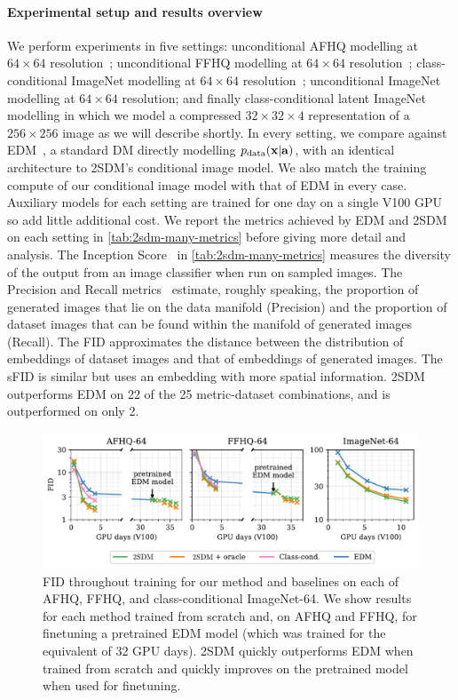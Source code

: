 \paragraph{Experimental setup and results overview}

We perform experiments in five settings: unconditional AFHQ modelling at $64\times64$ resolution~\citep{choi2020stargan}; unconditional FFHQ modelling at $64\times64$ resolution~\citep{karras2018style}; class-conditional ImageNet modelling at $64\times64$ resolution~\citep{deng2009imagenet}; unconditional ImageNet modelling at $64\times64$ resolution; and finally class-conditional latent ImageNet modelling in which we model a compressed $32\times32\times4$ representation of a $256\times256$ image as we will describe shortly. In every setting, we compare against EDM~\citep{karras2022elucidating}, a standard DM directly modelling $p_{\rm{data}}({\mathbf{x}}|{\mathbf{a}})$, with an identical architecture to 2SDM's conditional image model. We also match the training compute of our conditional image model with that of EDM in every case. Auxiliary models for each setting are trained for one day on a single V100 GPU so add little additional cost. We report the metrics achieved by EDM and 2SDM on each setting in \cref{tab:2sdm-many-metrics} before giving more detail and analysis. The Inception Score~\citep{salimans2016improved,barratt2018note} in \cref{tab:2sdm-many-metrics} measures the diversity of the output from an image classifier when run on sampled images. The Precision and Recall metrics~\citep{kynkaanniemi2019improved} estimate, roughly speaking, the proportion of generated images that lie on the data manifold (Precision) and the proportion of dataset images that can be found within the manifold of generated images (Recall). The FID approximates the distance between the distribution of embeddings of dataset images and that of embeddings of generated images. The sFID is similar but uses an embedding with more spatial information. 2SDM outperforms EDM on 22 of the 25 metric-dataset combinations, and is outperformed on only 2.


\begin{figure}[t]
    \centering
    \includegraphics[width=\textwidth]{figs/2sdm/cond-results-1.pdf}
    \caption{FID throughout training for our method and baselines on each of AFHQ, FFHQ, and class-conditional ImageNet-64. We show results for each method trained from scratch and, on AFHQ and FFHQ, for finetuning a pretrained EDM model (which was trained for the equivalent of 32 GPU days). 2SDM quickly outperforms EDM when trained from scratch and quickly improves on the pretrained model when used for finetuning.}
    \label{fig:fid_vs_training}
\end{figure}


